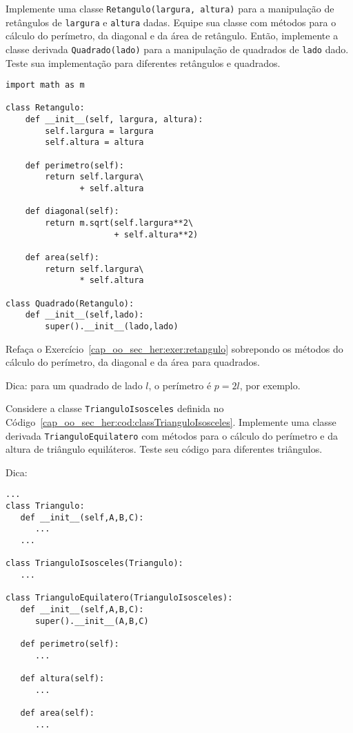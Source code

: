 \begin{exer}\label{cap_oo_sec_her:exer:retangulo}
  Implemente uma classe \lstinline+Retangulo(largura, altura)+ para a manipulação de retângulos de \lstinline+largura+ e \lstinline+altura+ dadas. Equipe sua classe com métodos para o cálculo do perímetro, da diagonal e da área de retângulo. Então, implemente a classe derivada \lstinline+Quadrado(lado)+ para a manipulação de quadrados de \lstinline+lado+ dado. Teste sua implementação para diferentes retângulos e quadrados.
\end{exer}
\begin{resp}

\begin{lstlisting}
import math as m

class Retangulo:
    def __init__(self, largura, altura):
        self.largura = largura
        self.altura = altura

    def perimetro(self):
        return self.largura\
               + self.altura

    def diagonal(self):
        return m.sqrt(self.largura**2\
                      + self.altura**2)

    def area(self):
        return self.largura\
               * self.altura

class Quadrado(Retangulo):
    def __init__(self,lado):
        super().__init__(lado,lado)
\end{lstlisting}

\end{resp}

\begin{exer}
  Refaça o Exercício~\ref{cap_oo_sec_her:exer:retangulo} sobrepondo os métodos do cálculo do perímetro, da diagonal e da área para quadrados.
\end{exer}
\begin{resp}
  Dica: para um quadrado de lado $l$, o perímetro é $p = 2l$, por exemplo.
\end{resp}

\begin{exer}
  Considere a classe \texttt{TrianguloIsosceles} definida no Código~\ref{cap_oo_sec_her:cod:classTrianguloIsosceles}. Implemente uma classe derivada \lstinline+TrianguloEquilatero+ com métodos para o cálculo do perímetro e da altura de triângulo equiláteros. Teste seu código para diferentes triângulos.
\end{exer}
\begin{resp}
  Dica:

\begin{lstlisting}
...
class Triangulo:
   def __init__(self,A,B,C):
      ...
   ...

class TrianguloIsosceles(Triangulo):
   ...

class TrianguloEquilatero(TrianguloIsosceles):
   def __init__(self,A,B,C):
      super().__init__(A,B,C)

   def perimetro(self):
      ...

   def altura(self):
      ...
   
   def area(self):
      ...
\end{lstlisting}

\end{resp}

